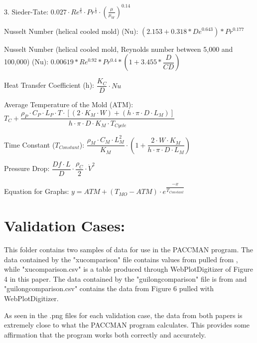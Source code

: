 \documentclass[a4paper,12pt]{article}
\begin{document}
\medskip

3. Sieder-Tate: $0.027 \cdot Re^{\frac{4}{5}} \cdot Pr^{\frac{1}{3}} \cdot (\frac{\mu}{\mu_{W}})^{0.14}$	

\medskip

Nusselt Number (helical cooled mold) (Nu): $(2.153+0.318*De^{0.643})*Pr^{0.177}$

\medskip

Nusselt Number (helical cooled mold,  Reynolds number between 5,000 and 100,000) (Nu): $0.00619*Re^{0.92}*Pr^{0.4}*(1+3.455*\dfrac{D}{CD})$

\medskip

Heat Transfer Coefficient (h): $\dfrac{K_{C}}{D} \cdot Nu$

\medskip

Average Temperature of the Mold (ATM): $T_{C} + \dfrac{\rho_{P} \cdot C_{P} \cdot L_{P} \cdot T \cdot [(2 \cdot K_{M} \cdot W) + (h \cdot \pi \cdot D \cdot L_{M})]}{h \cdot \pi \cdot D \cdot K_{M} \cdot T_{Cycle}}$ 

\medskip

Time Constant ($T_{Constant}$): $\dfrac{\rho_{M} \cdot C_{M} \cdot L_{M}^{2}}{K_{M}} \cdot (1 + \dfrac{2 \cdot W \cdot K_{M}}{h \cdot \pi \cdot D \cdot L_{M}})$

\medskip

Pressure Drop: $\dfrac{Df \cdot L}{D} \cdot \dfrac{\rho_{C}}{2} \cdot \dot{V}^{2}$

\medskip

Equation for Graphs: $y = ATM + (T_{MO} - ATM) \cdot e^{\dfrac{-x}{T_{Constant}}}$

\clearpage

\section*{Validation Cases:}

This folder contains two samples of data for use in the PACCMAN program.
The data contained by the "xucomparison" file contains values from pulled from \cite{XU2001}, while "xucomparison.csv" is a table produced through WebPlotDigitizer of Figure 4 in this  paper.
The data contained by the "guilongcomparison" file is from \cite{GUILONG2010} and "guilongcomparison.csv" contains the data from Figure 6 pulled with WebPlotDigitizer. 

\medskip

As seen in the .png files for each validation case, the data from both papers is extremely close to what the PACCMAN program calculates. This provides some affirmation that the program works both correctly and accurately.

\clearpage

\nocite{*} 

\end{document}
